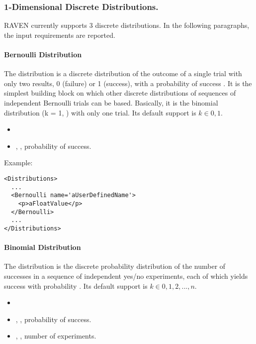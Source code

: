 \subsubsection{1-Dimensional Discrete Distributions.}
\label{subsubsec:1DDiscrete}
RAVEN currently supports 3 discrete distributions.
%
In the following paragraphs, the input requirements are reported.

\paragraph{Bernoulli Distribution}
\label{Bernoulli}
The  distribution is a discrete distribution of the outcome
of a single trial with only two results, 0 (failure) or 1 (success), with a
probability of success .
%
It is the simplest building block on which other discrete distributions of
sequences of independent Bernoulli trials can be based.
%
Basically, it is the binomial distribution (k = 1, ) with only
one trial.
%
Its default support is $k \in {0, 1}$.

%
\attrIntro
\vspace{-5mm}
\begin{itemize}
  \itemsep0em
  \item \nameDescription
\end{itemize}
\vspace{-5mm}
\subnodeIntro
\begin{itemize}
  \item {}, , probability of
  success.
 \end{itemize}
Example:
\begin{lstlisting}[style=XML]
<Distributions>
  ...
  <Bernoulli name='aUserDefinedName'>
    <p>aFloatValue</p>
  </Bernoulli>
  ...
</Distributions>
\end{lstlisting}

\paragraph{Binomial Distribution}
\label{Binomial}
The  distribution is the discrete probability distribution of
the number of successes in a sequence of  independent yes/no
experiments, each of which yields success with probability .
%
Its default support is $k \in {0, 1, 2, ..., n}$.

%
\attrIntro
\vspace{-5mm}
\begin{itemize}
  \itemsep0em
  \item \nameDescription
\end{itemize}
\vspace{-5mm}
\subnodesIntro
\begin{itemize}
  \item {}, , probability of
  success.
  \item {}, , number of
  experiments.
\end{itemize}

